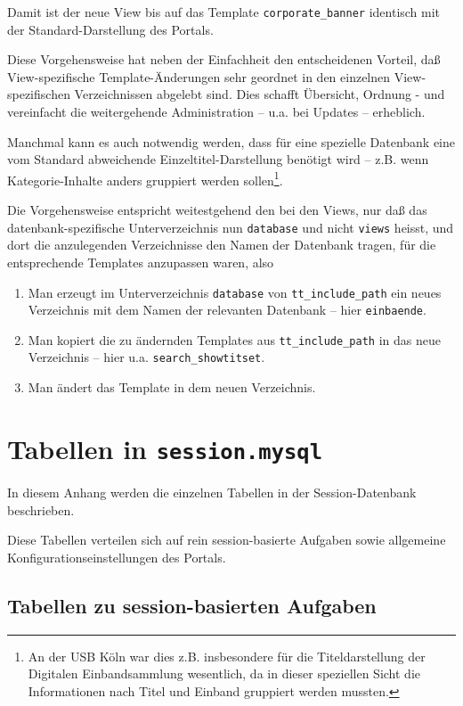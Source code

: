\documentclass[11pt, twoside, a4paper, BCOR8mm, DIV12, bibtotoc,idxtotoc]{scrbook}
\begin{document}
Damit ist der neue View bis auf das Template
\texttt{corporate\_banner} identisch mit der Standard-Darstellung des
Portals.

Diese Vorgehensweise hat neben der Einfachheit den entscheidenen
Vorteil, daß View-spezifische Template-Änderungen sehr geordnet in den
einzelnen View-spezifischen Verzeichnissen abgelebt sind. Dies schafft
Übersicht, Ordnung - und vereinfacht die weitergehende Administration
-- u.a. bei Updates -- erheblich.

Manchmal kann es auch notwendig werden, dass für eine spezielle
Datenbank eine vom Standard abweichende Einzeltitel-Darstellung
benötigt wird -- z.B. wenn Kategorie-Inhalte anders gruppiert werden
sollen\footnote{An der USB Köln war dies z.B. insbesondere für die
  Titeldarstellung der Digitalen Einbandsammlung wesentlich, da in
  dieser speziellen Sicht die Informationen nach Titel und Einband
  gruppiert werden mussten.}.

Die Vorgehensweise entspricht weitestgehend den bei den Views, nur daß
das datenbank-spezifische Unterverzeichnis nun \texttt{database} und
nicht \texttt{views} heisst, und dort die anzulegenden Verzeichnisse
den Namen der Datenbank tragen, für die entsprechende Templates
anzupassen waren, also

\begin{enumerate}
\item Man erzeugt im Unterverzeichnis \texttt{database} von
  \texttt{tt\_include\_path} ein neues Verzeichnis mit dem Namen der
  relevanten Datenbank -- hier \texttt{einbaende}.
\item Man kopiert die zu ändernden Templates aus
  \texttt{tt\_include\_path} in das neue Verzeichnis -- hier u.a. \texttt{search\_showtitset}.
\item Man ändert das Template in dem neuen Verzeichnis.
\end{enumerate}


\appendix

\chapter{Tabellen in \texttt{session.mysql}}

In diesem Anhang werden die einzelnen Tabellen in der
Session-Datenbank beschrieben.

Diese Tabellen verteilen sich auf rein session-basierte Aufgaben sowie
allgemeine Konfigurations\-ein\-stellungen des Portals.


\section{Tabellen zu session-basierten Aufgaben}
\end{document}
